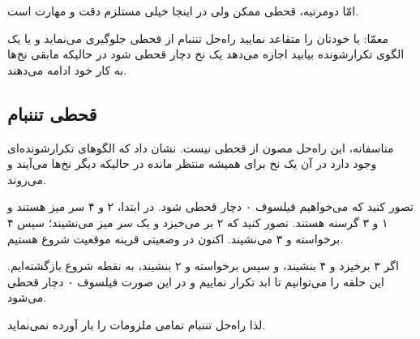 \documentclass{book}
\newcommand{\clearemptydoublepage}{\newpage\cleardoublepage}
\begin{document}
    امّا دومرتبه، قحطی ممکن ولی در اینجا خیلی مستلزم دقت و مهارت است.

    معمّا: یا خودتان را متقاعد نمایید راه‌حل تننبام از قحطی جلوگیری می‌نماید و یا یک الگوی تکرارشونده بیابید اجازه می‌دهد یک نخ دچار قحطی شود 
    در حالیکه مابقی نخ‌ها به کار خود ادامه می‌دهند. 


\clearemptydoublepage
\subsection{قحطی تننبام}

    متاسفانه، این راه‌حل مصون از قحطی نیست.  نشان داد که الگوهای تکرارشونده‌ای وجود دارد در آن یک نخ برای همیشه منتظر مانده در 
    حالیکه دیگر نخ‌ها می‌آیند و می‌روند\cite{gingras90dining}.

    تصور کنید که می‌خواهیم فیلسوف ۰ دچار قحطی شود. در ابتدا، ۲ و ۴ سر میز هستند و ۱ و ۳ گرسنه هستند. تصور کنید که ۲ بر می‌خیزد و یک سر میز می‌نشیند؛ 
    سپس ۴ برخواسته و ۳ می‌نشیند. اکنون در وضعیتی قرینه موقعیت شروع هستیم. 

    اگر ۳ برخیزد و ۴ بنشیند، و سپس  برخواسته و ۲ بنشیند، به نقطه شروع بازگشته‌ایم. 
    این  حلقه را می‌توانیم تا ابد تکرار نماییم و در این صورت فیلسوف ۰ دچار قحطی می‌شود. 

    لذا راه‌حل تننبام تمامی ملزومات را بار آورده نمی‌نماید. 


\clearemptydoublepage
\end{document}
